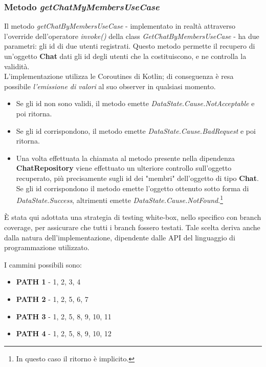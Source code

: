 \documentclass{natourDoc}
\begin{document}
\newpage

\subsubsection{Metodo \textit{getChatMyMembersUseCase}}

Il metodo \textit{getChatByMembersUseCase} - implementato in realtà  attraverso l'override dell'operatore \textit{invoke()}
della class \textit{GetChatByMembersUseCase} - ha due parametri: gli id di due utenti registrati.
Questo metodo permette il recupero di un'oggetto \textbf{Chat} dati gli id degli utenti che la costituiscono, e ne controlla la validità. \\
L'implementazione utilizza le Coroutines di Kotlin; di conseguenza è resa possibile \textit{l'emissione di valori} al suo observer in qualsiasi
momento.
\begin{itemize}
	\item Se gli id non sono validi, il metodo emette \textit{DataState.Cause.NotAcceptable} e poi ritorna.
	\item Se gli id corrispondono, il metodo emette \textit{DataState.Cause.BadRequest} e poi ritorna.
	\item Una volta effettuata la chiamata al metodo presente nella dipendenza \textbf{ChatRepository} viene 
				effettuato un ulteriore controllo sull'oggetto recuperato, più precisamente sugli id dei "membri" dell'oggetto di tipo
				\textbf{Chat}. Se gli id corrispondono il metodo emette l'oggetto ottenuto sotto forma di \textit{DataState.Success},
				altrimenti emette \textit{DataState.Cause.NotFound}.\footnote{In questo caso il ritorno è implicito.}
\end{itemize}

È stata qui adottata una strategia di testing white-box, nello specifico con branch coverage, per assicurare che tutti i branch fossero testati.
Tale scelta deriva anche dalla natura dell'implementazione, dipendente dalle API del linguaggio di programmazione utilizzato.

I cammini possibili sono:
\begin{itemize}
	\item \textbf{PATH 1} - 1, 2, 3, 4
	\item \textbf{PATH 2} - 1, 2, 5, 6, 7
	\item \textbf{PATH 3} - 1, 2, 5, 8, 9, 10, 11
	\item \textbf{PATH 4} - 1, 2, 5, 8, 9, 10, 12 
\end{itemize}
\end{document}
